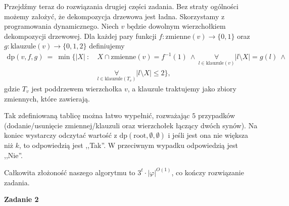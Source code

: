 \documentclass[12pt]{article}
\begin{document}
	\medskip
	
	Przejdźmy teraz do rozwiązania drugiej części zadania. Bez straty ogólności
	możemy założyć, że dekompozycja drzewowa jest ładna. Skorzystamy z
	programowania dynamicznego. Niech \(v\) będzie dowolnym wierzchołkiem
	dekompozycji drzewowej. Dla każdej pary funkcji \(f : \text{zmienne}(v) \to
	\{0, 1\}\) oraz \(g : \text{klauzule}(v) \to \{0, 1, 2\}\) definiujemy
	\begin{align*}
		\text{dp}(v, f, g) \ = \ \min \bigg\{ |X| \ : \ &X \cap
		\text{zmienne}(v) = f^{-1}(1) \ \wedge \ \underset{l \in
		\text{klauzule}(v)}{\forall} |l	\setminus X| = g(l) \ \wedge \\
		&\underset{l \in \text{klauzule}(T_{v})}{\forall} |l \setminus X|
		\leqslant 2 \bigg\} \text{,}
	\end{align*}
	gdzie \(T_{v}\) jest poddrzewem wierzchołka \(v\), a klauzule traktujemy
	jako zbiory zmiennych, które zawierają.
	
	\medskip
	
	Tak zdefiniowaną tablicę można łatwo wypełnić, rozważając \(5\) przypadków
	(dodanie/usunięcie zmiennej/klauzuli oraz wierzchołek łączący dwóch synów).
	Na koniec wystarczy odczytać wartość z \(\text{dp}(\text{root}, \emptyset,
	\emptyset)\) i jeśli jest ona nie większa niż \(k\), to odpowiedzią jest
	,,Tak''. W przeciwnym wypadku odpowiedzią jest ,,Nie''.
	
	\medskip
	
	Całkowita złożoność naszego algorytmu to \(3^{t} \cdot |\varphi|^{O(1)}\),
	co kończy rozwiązanie zadania.
	
	\newpage
	
	\textbf{Zadanie 2}
	
	\medskip
	
\end{document}
